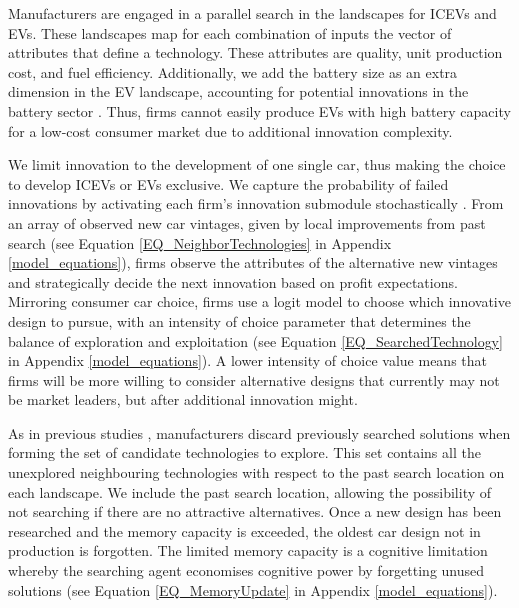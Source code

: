 \documentclass[12pt]{article}
\begin{document}
	Manufacturers are engaged in a parallel search in the landscapes for ICEVs and EVs. These landscapes map for each combination of inputs the vector of attributes that define a technology. These attributes are quality, unit production cost, and fuel efficiency. Additionally, we add the battery size as an extra dimension in the EV landscape, accounting for potential innovations in the battery sector \citep{yao2025critically}. Thus, firms cannot easily produce EVs with high battery capacity for a low-cost consumer market due to additional innovation complexity.
    
    We limit innovation to the development of one single car, thus making the choice to develop ICEVs or EVs exclusive. We capture the probability of failed innovations by activating each firm's innovation submodule stochastically \citep{nelson1977search}. From an array of observed new car vintages, given by local improvements from past search (see Equation \ref{EQ_NeighborTechnologies} in Appendix \ref{model_equations}), firms observe the attributes of the alternative new vintages and strategically decide the next innovation based on profit expectations. Mirroring consumer car choice, firms use a logit model to choose which innovative design to pursue, with an intensity of choice parameter that determines the balance of exploration and exploitation \citep{Puranam2015} (see Equation \ref{EQ_SearchedTechnology} in Appendix \ref{model_equations}). A lower intensity of choice value means that firms will be more willing to consider alternative designs that currently may not be market leaders, but after additional innovation might.
	
	As in previous studies \citep{jain2014memory,bassart2026mixing}, manufacturers discard previously searched solutions when forming the set of candidate technologies to explore. This set contains all the unexplored neighbouring technologies with respect to the past search location on each landscape. We include the past search location, allowing the possibility of not searching if there are no attractive alternatives. Once a new design has been researched and the memory capacity is exceeded, the oldest car design not in production is forgotten. The limited memory capacity is a cognitive limitation whereby the searching agent economises cognitive power by forgetting unused solutions (see Equation \ref{EQ_MemoryUpdate} in Appendix \ref{model_equations}).  %
	
\end{document}
